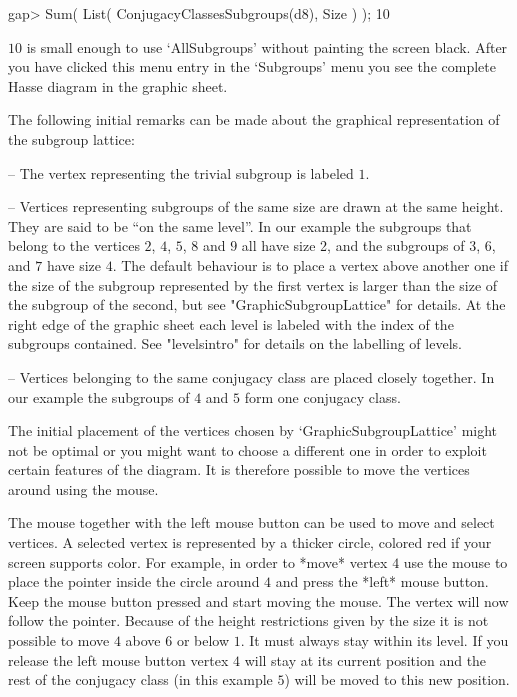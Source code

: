 \begintt
    gap> Sum( List( ConjugacyClassesSubgroups(d8), Size ) );
    10 
\endtt

$10$ is small enough to use `AllSubgroups' without painting the screen
black.  After you have clicked this menu entry in the `Subgroups' menu you
see the complete Hasse diagram in the graphic sheet.

The   following initial  remarks  can    be  made  about  the   graphical
representation of the subgroup lattice:

\beginlist
\item{--} The vertex representing the trivial subgroup is labeled $1$.
  
\item{--} Vertices representing subgroups of the same size are drawn at the
  same height. They are said to be ``on the same level''.  In our example
  the subgroups that belong to the vertices $2$, $4$, $5$, $8$ and $9$ all
  have size 2, and the subgroups of $3$, $6$, and $7$ have size $4$. The
  default behaviour is to place a vertex above another one if the size of
  the subgroup represented by the first vertex is larger than the size of
  the subgroup of the second, but see "GraphicSubgroupLattice" for details. At
  the right edge of the graphic sheet each level is labeled with the index
  of the subgroups contained. See "levelsintro" for details on the
  labelling of levels.
  
\item{--} Vertices belonging to the same conjugacy class are placed closely
  together.  In our example the subgroups of $4$ and $5$ form one conjugacy
  class.
\endlist

The initial placement of the vertices chosen by `GraphicSubgroupLattice'
might not be optimal or you might want to choose a different one in order
to exploit certain features of the diagram.  It is therefore possible to
move the vertices around using the mouse.

The mouse together with the left mouse button can be used to move and
select vertices. A selected vertex is represented by a thicker circle,
colored red if your screen supports color.  For example, in order to *move*
vertex $4$ use the mouse to place the pointer inside the circle around $4$
and press the *left* mouse button.  Keep the mouse button pressed and start
moving the mouse.  The vertex will now follow the pointer.  Because of the
height restrictions given by the size it is not possible to move $4$ above
$6$ or below $1$. It must always stay within its level. If you release the
left mouse button vertex $4$ will stay at its current position and the rest
of the conjugacy class (in this example $5$) will be moved to this new
position.

